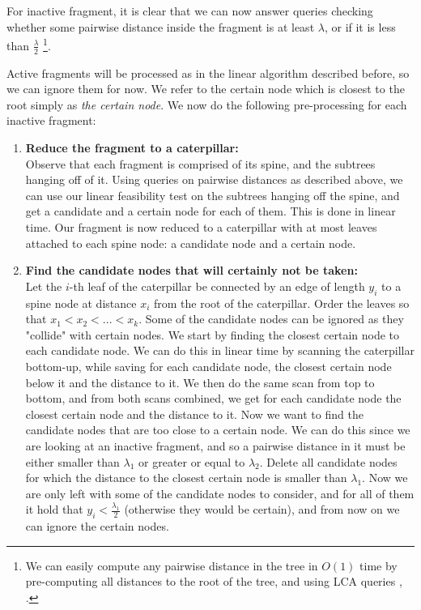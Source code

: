 \documentclass[11pt,a4paper]{article}
\theoremstyle{definition}
\theoremstyle{remark}
\begin{document}
For inactive fragment, it is clear that we can now answer queries checking whether some pairwise distance inside the fragment is at least $\lambda$, or if it is less than $\frac{\lambda}{2}$ \footnote{We can easily compute any pairwise distance in the tree in $O(1)$ time by pre-computing all distances to the root of the tree, and using LCA queries \cite{Bender2000}, \cite{Djidjev1991}.}.

Active fragments will be processed as in the linear algorithm described before, so we can ignore them for now. We refer to the certain node which is closest to the root simply as \textit{the certain node}. We now do the following pre-processing for each inactive fragment:
\begin{enumerate}
\item\textbf{Reduce the fragment to a caterpillar:}\\
Observe that each fragment is comprised of its spine, and the subtrees hanging off of it. Using queries on pairwise distances as described above, we can use our linear feasibility test on the subtrees hanging off the spine, and get a candidate and a certain node for each of them. This is done in linear time.
Our fragment is now reduced to a caterpillar with at most leaves attached to each spine node: a candidate
node and a certain node.
\item\label{removing certain nodes}
\textbf{Find the candidate nodes that will certainly not be taken:}\\ %
Let the $i$-th leaf of the caterpillar be connected by an edge of length $y_i$ to a spine node at distance $x_i$ from the root of the caterpillar. Order the leaves so that $x_1 < x_2 < ... < x_k$.
Some of the candidate nodes can be ignored as they "collide" with certain nodes. We start by finding the closest certain node to each candidate node. We can do this in linear time by scanning the caterpillar bottom-up, while saving for each candidate node, the closest certain node below it and the distance to it. We then do the same scan from top to bottom, and from both scans combined, we get for each candidate node the closest certain node and the distance to it. Now we want to find the candidate nodes that are too close to a certain node. We can do this since we are looking at an inactive fragment, and so a pairwise distance in it must be either smaller than $\lambda_1$ or greater or equal to $\lambda_2$. Delete all candidate nodes for which the distance to the closest certain node is smaller than $\lambda_1$. 
Now we are only left with some of the candidate nodes to consider, and for all of them it hold that $y_i < \frac{\lambda_1}{2}$ (otherwise they would be certain), and from now on we can ignore the certain nodes.

\end{enumerate}
\end{document}
